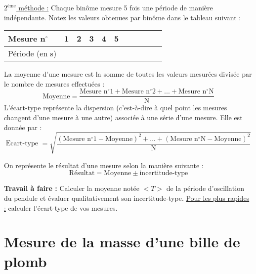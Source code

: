 \underline{$2^{\text{ème}}$ méthode :} Chaque binôme mesure 5 fois une période de manière indépendante. Notez les valeurs obtenues par binôme dans le tableau suivant :
\\

\begin{tabular}{|l|C{0.14}|C{0.14}|C{0.14}|C{0.14}|C{0.14}|C{0.14}|C{0.14}|C{0.14}|C{0.14}|C{0.14}|}
\hline
     Mesure n$^{\circ}$ & 1 & 2 & 3 & 4 & 5 \\
     \hline
     Période (en s) & & & & & \\
     \hline
\end{tabular}
\newline
\newline

\begin{tcolorbox}[colback=blue!5!white,colframe=white!75!black,title=Document 1 :]
La moyenne d'une mesure est la somme de toutes les valeurs mesurées divisée par le nombre de mesures effectuées :
\begin{equation*}
    \text{Moyenne} = \frac{\text{Mesure n$^{\circ}$1}+\text{Mesure n$^{\circ}$2} + ... + \text{Mesure n$^{\circ}$N}}{\text{N}}
\end{equation*}
L'écart-type représente la dispersion (c'est-à-dire à quel point les mesures changent d'une mesure à une autre) associée à une série d'une mesure. Elle est donnée par :
\begin{equation*}
    \text{Ecart-type }= \sqrt{\frac{\left(\text{Mesure n$^{\circ}$1}-\text{Moyenne}\right)^2+...+\left(\text{Mesure n$^{\circ}$N}-\text{Moyenne}\right)^2}{\text{N}}}
\end{equation*}
\end{tcolorbox}

\begin{tcolorbox}[colback=blue!5!white,colframe=white!75!black,title=Document 2 :]
On représente le résultat d'une mesure selon la manière suivante :
\begin{equation*}
    \text{Résultat} = \text{Moyenne} \pm \text{incertitude-type}
\end{equation*}
\end{tcolorbox}
\textbf{Travail à faire :} Calculer la moyenne notée $<T>$ de la période d'oscillation du pendule et évaluer qualitativement son incertitude-type. \underline{Pour les plus rapides :} calculer l'écart-type de vos mesures.

\newpage

\section{Mesure de la masse d'une bille de plomb}

